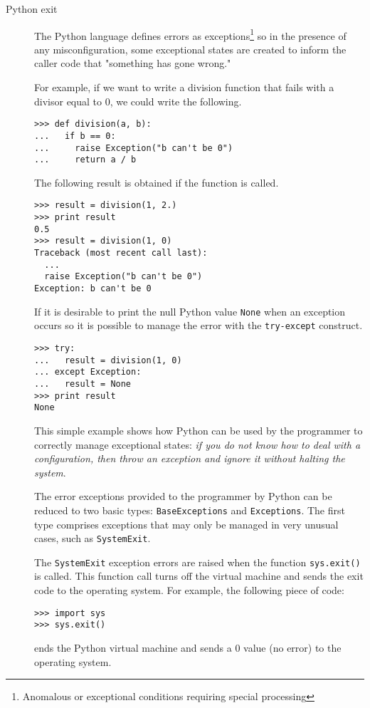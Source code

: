\documentclass[final,5p,times,twocolumn,authoryear]{elsarticle}
\begin{document}
\begin{description}
\item [Python exit]
	The Python language defines errors as 
    exceptions\footnote{Anomalous or exceptional conditions requiring special processing} 
    so in the presence of any misconfiguration, some exceptional states are created to 
    inform the caller code that "something has gone wrong."
	
    For example, if we want to write a division function that fails with a 
    divisor equal to 0, we could write the following.
%
\begin{verbatim}
>>> def division(a, b):
...   if b == 0:
...	    raise Exception("b can't be 0")
...     return a / b
\end{verbatim}
%
The following result is obtained if the function is called.
%
\begin{verbatim}
>>> result = division(1, 2.)
>>> print result
0.5
>>> result = division(1, 0)
Traceback (most recent call last):
  ...
  raise Exception("b can't be 0")
Exception: b can't be 0
\end{verbatim}

If it is desirable to print the null Python value \texttt{None} when
an exception occurs so it is possible to manage the error 
with the \texttt{try-except} construct.

\begin{verbatim}
>>> try:
...   result = division(1, 0)
... except Exception:
...   result = None
>>> print result
None
\end{verbatim}

This simple example shows how Python can be used by the programmer
to correctly manage exceptional states: 
\textit{if you do not know how to deal with a configuration, then
throw an exception and ignore it without halting the system}.

The error exceptions provided to the programmer by Python 
can be reduced to two basic types: 
\texttt{BaseExceptions} and \texttt{Exceptions}. 
The first type comprises exceptions that may only be managed in very 
unusual cases, such as \texttt{SystemExit}.

The \texttt{SystemExit} exception errors are raised when the function 
\texttt{sys.exit()} is called. This function call
turns off the virtual machine and sends the exit code to the operating 
system. 
%
For example, the following piece of code:
%
\begin{verbatim}
>>> import sys
>>> sys.exit()
\end{verbatim}
%
ends the Python virtual machine and sends a 0 value (no error) to the operating 
system.


\end{description}
\end{document}
